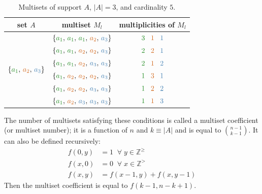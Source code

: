 \documentclass[12pt]{article}
\begin{document}
\begin{table}
  \centering
  \begin{tabular}{| c | c | c |}
    \hline
    \rowcolor{bg} set $A$ & multiset $M_l$ & multiplicities of $M_l$          \\
    \hline
    \multirow{6}{*}{$\{{\color{c1}a_1}, \, {\color{c2}a_2}, \, 
                       {\color{c3}a_3}\}$} 
    & $\{{\color{c1}a_1}, \, {\color{c1}a_1}, \, {\color{c1}a_1}, \, 
         {\color{c2}a_2}, \, {\color{c3}a_3}\}$ 
    & ${\color{c1}3} \;\;\; {\color{c2}1} \;\;\; {\color{c3}1}$               \\
    & $\{{\color{c1}a_1}, \, {\color{c1}a_1}, \, {\color{c2}a_2}, \,
         {\color{c2}a_2}, \, {\color{c3}a_3}\}$ 
    & ${\color{c1}2} \;\;\; {\color{c2}2} \;\;\; {\color{c3}1}$               \\         & $\{{\color{c1}a_1}, \, {\color{c1}a_1}, \, {\color{c2}a_2}, \, 
         {\color{c3}a_3}, \, {\color{c3}a_3}\}$ 
    & ${\color{c1}2} \;\;\; {\color{c2}1} \;\;\; {\color{c3}2}$               \\         & $\{{\color{c1}a_1}, \, {\color{c2}a_2}, \, {\color{c2}a_2}, \, 
         {\color{c2}a_2}, \, {\color{c3}a_3}\}$ 
    & ${\color{c1}1} \;\;\; {\color{c2}3} \;\;\; {\color{c3}1}$               \\
    & $\{{\color{c1}a_1}, \, {\color{c2}a_2}, \, {\color{c2}a_2}, \, 
         {\color{c3}a_3}, \, {\color{c3}a_3}\}$ 
    & ${\color{c1}1} \;\;\; {\color{c2}2} \;\;\; {\color{c3}2}$               \\
    & $\{{\color{c1}a_1}, \, {\color{c2}a_2}, \, {\color{c3}a_3}, \, 
         {\color{c3}a_3}, \, {\color{c3}a_3}\}$ 
    & ${\color{c1}1} \;\;\; {\color{c2}1} \;\;\; {\color{c3}3}$               \\    
    \hline
  \end{tabular}
  \caption{Multisets of support $A$, $|A| = 3$, and cardinality $5$.}
  \label{tab:ex1}
\end{table}  

The number of multisets satisfying these conditions is called a multiset coefficient (or multiset number); it is a function of $n$ and $k \equiv |A|$ and is equal to $\binom{n - 1}{k - 1}$. It can also be defined recursively:
\begin{align*}
  f(0, y) &= 1 \;\; \forall \; y \in \mathbb{Z}^{\geqslant} \\
  f(x, 0) &= 0 \;\; \forall \; x \in \mathbb{Z}^{>} \\
  f(x, y) &= f(x - 1, y) + f(x, y - 1)
\end{align*}
Then the multiset coefficient is equal to $f(k - 1, n - k + 1)$. 
\end{document}
